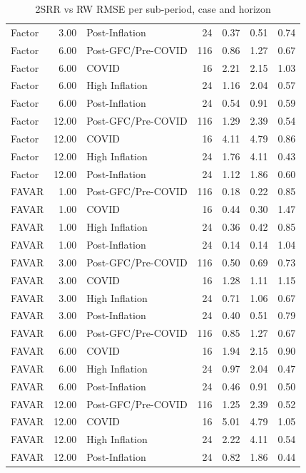 \begin{table}[ht]
\begin{tabular}{lrlrrrr}
  Factor & 3.00 & Post-Inflation &  24 & 0.37 & 0.51 & 0.74 \\ 
  Factor & 6.00 & Post-GFC/Pre-COVID & 116 & 0.86 & 1.27 & 0.67 \\ 
  Factor & 6.00 & COVID &  16 & 2.21 & 2.15 & 1.03 \\ 
  Factor & 6.00 & High Inflation &  24 & 1.16 & 2.04 & 0.57 \\ 
  Factor & 6.00 & Post-Inflation &  24 & 0.54 & 0.91 & 0.59 \\ 
  Factor & 12.00 & Post-GFC/Pre-COVID & 116 & 1.29 & 2.39 & 0.54 \\ 
  Factor & 12.00 & COVID &  16 & 4.11 & 4.79 & 0.86 \\ 
  Factor & 12.00 & High Inflation &  24 & 1.76 & 4.11 & 0.43 \\ 
  Factor & 12.00 & Post-Inflation &  24 & 1.12 & 1.86 & 0.60 \\ 
  FAVAR & 1.00 & Post-GFC/Pre-COVID & 116 & 0.18 & 0.22 & 0.85 \\ 
  FAVAR & 1.00 & COVID &  16 & 0.44 & 0.30 & 1.47 \\ 
  FAVAR & 1.00 & High Inflation &  24 & 0.36 & 0.42 & 0.85 \\ 
  FAVAR & 1.00 & Post-Inflation &  24 & 0.14 & 0.14 & 1.04 \\ 
  FAVAR & 3.00 & Post-GFC/Pre-COVID & 116 & 0.50 & 0.69 & 0.73 \\ 
  FAVAR & 3.00 & COVID &  16 & 1.28 & 1.11 & 1.15 \\ 
  FAVAR & 3.00 & High Inflation &  24 & 0.71 & 1.06 & 0.67 \\ 
  FAVAR & 3.00 & Post-Inflation &  24 & 0.40 & 0.51 & 0.79 \\ 
  FAVAR & 6.00 & Post-GFC/Pre-COVID & 116 & 0.85 & 1.27 & 0.67 \\ 
  FAVAR & 6.00 & COVID &  16 & 1.94 & 2.15 & 0.90 \\ 
  FAVAR & 6.00 & High Inflation &  24 & 0.97 & 2.04 & 0.47 \\ 
  FAVAR & 6.00 & Post-Inflation &  24 & 0.46 & 0.91 & 0.50 \\ 
  FAVAR & 12.00 & Post-GFC/Pre-COVID & 116 & 1.25 & 2.39 & 0.52 \\ 
  FAVAR & 12.00 & COVID &  16 & 5.01 & 4.79 & 1.05 \\ 
  FAVAR & 12.00 & High Inflation &  24 & 2.22 & 4.11 & 0.54 \\ 
  FAVAR & 12.00 & Post-Inflation &  24 & 0.82 & 1.86 & 0.44 \\ 
   \hline
\end{tabular}
\caption{2SRR vs RW RMSE per sub-period, case and horizon} 
\label{tab:subperiods}
\end{table}
